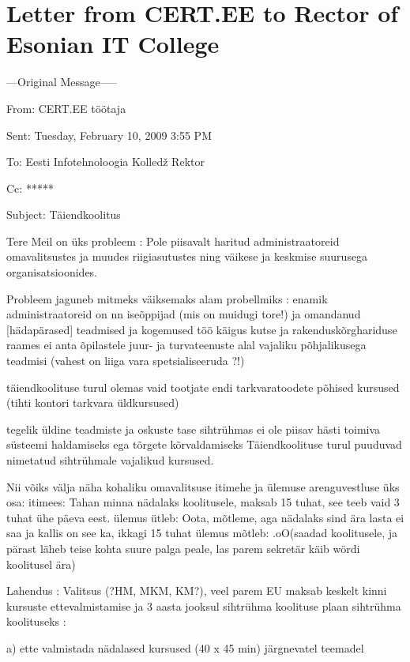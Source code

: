 \chapter{Letter from CERT.EE to Rector of Esonian IT College}
\label{Letter from CERT.EE to Rector of Esonian IT College}

\small
---Original Message-----

From: CERT.EE töötaja\par
Sent: Tuesday, February 10, 2009 3:55 PM \par
To: Eesti Infotehnoloogia Kolledž Rektor \par
Cc: ***** \par
Subject: Täiendkoolitus\par

Tere
Meil on üks probleem  :
Pole piisavalt haritud administraatoreid omavalitsustes ja 
muudes riigiasutustes ning väikese ja keskmise suurusega organisatsioonides.

Probleem jaguneb mitmeks väiksemaks alam probellmiks :
enamik administraatoreid on nn iseõppijad (mis on muidugi tore!)
ja omandanud [hädapärased] teadmised ja kogemused töö käigus
kutse ja rakenduskõrghariduse raames ei anta õpilastele juur- ja
 turvateenuste alal vajaliku põhjalikusega teadmisi 
(vahest on liiga vara spetsialiseeruda ?!)

täiendkoolituse turul olemas vaid tootjate endi tarkvaratoodete põhised kursused 
(tihti kontori tarkvara üldkursused)

tegelik üldine teadmiste ja oskuste tase sihtrühmas 
ei ole piisav hästi toimiva süsteemi haldamiseks 
ega tõrgete kõrvaldamiseks
Täiendkoolituse turul puuduvad nimetatud sihtrühmale 
vajalikud kursused.

Nii võiks välja näha kohaliku omavalitsuse itimehe ja ülemuse arenguvestluse üks osa:
itimees: Tahan minna nädalaks koolitusele, maksab 15 tuhat, see teeb vaid 3 tuhat ühe päeva eest. ülemus ütleb: Oota, mõtleme, aga nädalaks sind ära lasta ei saa ja kallis on see ka, ikkagi 15 tuhat ülemus mõtleb: .oO(saadad koolitusele, ja pärast läheb teise kohta suure palga peale, las parem sekretär käib wördi koolitusel ära)

Lahendus :
Valitsus (?HM, MKM, KM?), veel parem EU maksab keskelt kinni kursuste ettevalmistamise ja 3 aasta jooksul sihtrühma koolituse plaan sihtrühma koolituseks :

a) ette valmistada nädalased kursused (40 x 45 min) järgnevatel teemadel

